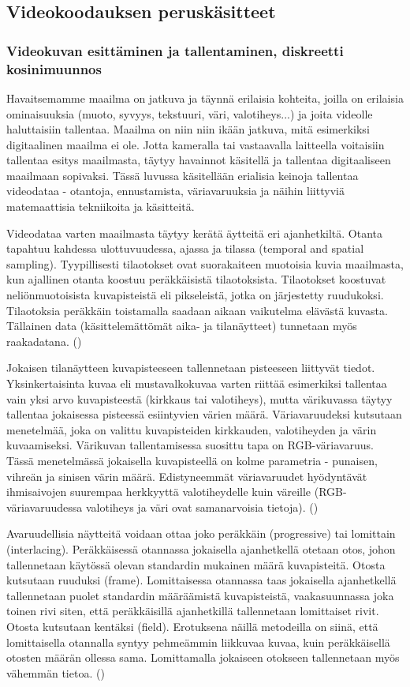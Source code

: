 \subsection{Videokoodauksen peruskäsitteet}

\subsubsection{Videokuvan esittäminen ja tallentaminen, diskreetti kosinimuunnos}

Havaitsemamme maailma on jatkuva ja täynnä erilaisia kohteita, joilla on
erilaisia ominaisuuksia (muoto, syvyys, tekstuuri, väri, valotiheys...)
ja joita videolle haluttaisiin tallentaa. Maailma on niin niin ikään jatkuva,
mitä esimerkiksi digitaalinen maailma ei ole. Jotta kameralla tai vastaavalla
laitteella voitaisiin tallentaa esitys maailmasta, täytyy havainnot käsitellä ja
tallentaa digitaaliseen maailmaan sopivaksi. Tässä luvussa käsitellään
erialisia keinoja tallentaa videodataa - otantoja, ennustamista, väriavaruuksia
ja näihin liittyviä matemaattisia tekniikoita ja käsitteitä.

Videodataa varten maailmasta täytyy kerätä äytteitä eri ajanhetkiltä. Otanta
tapahtuu kahdessa ulottuvuudessa, ajassa ja tilassa (temporal and spatial
sampling). Tyypillisesti tilaotokset ovat suorakaiteen muotoisia kuvia
maailmasta, kun ajallinen otanta koostuu peräkkäisistä tilaotoksista.
Tilaotokset koostuvat neliönmuotoisista kuvapisteistä eli pikseleistä, jotka
on järjestetty ruudukoksi. Tilaotoksia peräkkäin toistamalla saadaan aikaan
vaikutelma elävästä kuvasta. Tällainen data (käsittelemättömät aika- ja
tilanäytteet) tunnetaan myös raakadatana. (\cite{h264})

Jokaisen tilanäytteen kuvapisteeseen tallennetaan pisteeseen liittyvät
tiedot. Yksinkertaisinta kuvaa eli mustavalkokuvaa varten riittää esimerkiksi
tallentaa vain yksi arvo kuvapisteestä (kirkkaus tai valotiheys), mutta
värikuvassa täytyy tallentaa jokaisessa pisteessä esiintyvien värien määrä.
Väriavaruudeksi kutsutaan menetelmää, joka on valittu kuvapisteiden kirkkauden,
valotiheyden ja värin kuvaamiseksi. Värikuvan tallentamisessa suosittu tapa on
RGB-väriavaruus. Tässä menetelmässä jokaisella kuvapisteellä on
kolme parametria - punaisen, vihreän ja sinisen värin määrä. Edistyneemmät
väriavaruudet hyödyntävät ihmisaivojen suurempaa herkkyyttä valotiheydelle
kuin väreille (RGB-väriavaruudessa valotiheys ja väri ovat samanarvoisia
tietoja). (\cite{h264})

Avaruudellisia näytteitä voidaan ottaa joko peräkkäin (progressive) tai
lomittain (interlacing). Peräkkäisessä otannassa jokaisella ajanhetkellä
otetaan otos, johon tallennetaan käytössä olevan standardin mukainen
määrä kuvapisteitä. Otosta kutsutaan ruuduksi (frame). Lomittaisessa
otannassa taas jokaisella ajanhetkellä tallennetaan puolet standardin
määräämistä kuvapisteistä, vaakasuunnassa joka toinen rivi siten, että
peräkkäisillä ajanhetkillä tallennetaan lomittaiset rivit. Otosta kutsutaan
kentäksi (field). Erotuksena näillä metodeilla on siinä, että lomittaisella
otannalla syntyy pehmeämmin liikkuvaa kuvaa, kuin peräkkäisellä otosten määrän
ollessa sama. Lomittamalla jokaiseen otokseen tallennetaan myös vähemmän tietoa.
(\cite{h264})

